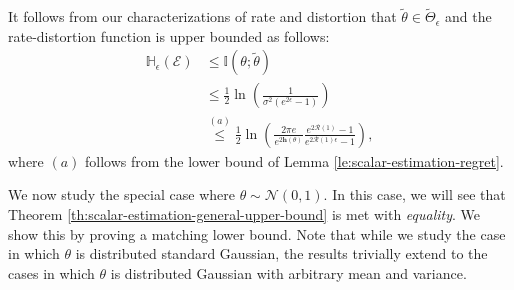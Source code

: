 \documentclass[twoside,11pt]{article}
\renewenvironment{proof}{\par\noindent{\bf Proof\ }}{\hfill\BlackBox\\[2mm]}
\newenvironment{proof}{\par\noindent{\bf Proof\ }}{\hfill\BlackBox\\[2mm]}
\def\environment{\mathcal{E}}
\def\proxyset{\tilde{\Theta}}
\def\regret{\mathcal{R}}
\def\diffentropy{\bf h}
\def\proxytheta{\tilde{\theta}}
\def\H{\mathbb{H}}
\def\diffentropy{\mathbf{h}}
\def\I{\mathbb{I}}
\begin{document}
\begin{proof}
    It follows from our characterizations of rate and distortion that $\proxytheta \in \proxyset_\epsilon$ and the rate-distortion function is upper bounded as follows:
    \begin{align*}
    \H_\epsilon(\environment)
    & \leq \I(\theta;\proxytheta)\\
    & \leq \frac{1}{2}\ln\left(\frac{1}{\sigma^2(e^{2\epsilon}-1)}\right)\\
    & \overset{(a)}{\leq} \frac{1}{2}\ln\left(\frac{2\pi e}{e^{2\diffentropy(\theta)}} \frac{e^{2\regret(1)}-1}{e^{2\regret(1)\epsilon}-1}\right),
    \end{align*}
    where $(a)$ follows from the lower bound of Lemma \ref{le:scalar-estimation-regret}.
\end{proof}

We now study the special case where $\theta \sim \mathcal{N}(0, 1)$. In this case, we will see that Theorem \ref{th:scalar-estimation-general-upper-bound} is met with \emph{equality}. We show this by proving a matching lower bound. Note that while we study the case in which $\theta$ is distributed standard Gaussian, the results trivially extend to the cases in which $\theta$ is distributed Gaussian with arbitrary mean and variance.
\end{document}
